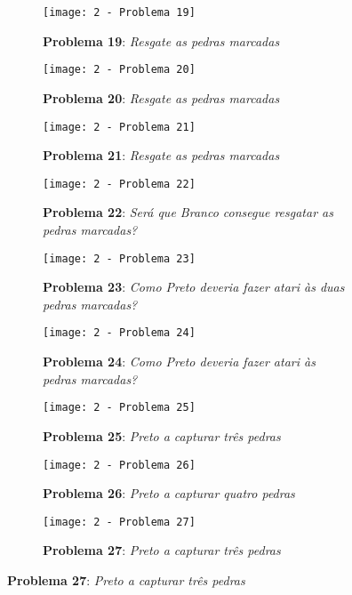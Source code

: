 \pagebreak

\begin{figure}[ht!]
    \centering
    \captionsetup{justification=raggedright,singlelinecheck=false}
    \begin{subfigure}[t]{.3\textwidth}
        \texttt{[image: 2 - Problema 19]}
        \caption*{\textbf{Problema 19}: \emph{Resgate as pedras marcadas}}
    \end{subfigure}
    \hfill
    \begin{subfigure}[t]{.3\textwidth}
        \texttt{[image: 2 - Problema 20]}
        \caption*{\textbf{Problema 20}: \emph{Resgate as pedras marcadas}}
    \end{subfigure}
    \hfill
    \begin{subfigure}[t]{.3\textwidth}
        \texttt{[image: 2 - Problema 21]}
        \caption*{\textbf{Problema 21}: \emph{Resgate as pedras marcadas}}
    \end{subfigure}
    \par\bigskip
    \begin{subfigure}[t]{.3\textwidth}
        \texttt{[image: 2 - Problema 22]}
        \caption*{\textbf{Problema 22}: \emph{Será que Branco consegue resgatar as pedras marcadas?}}
    \end{subfigure}
    \hfill
    \begin{subfigure}[t]{.3\textwidth}
        \texttt{[image: 2 - Problema 23]}
        \caption*{\textbf{Problema 23}: \emph{Como Preto deveria fazer atari às duas pedras marcadas?}}
    \end{subfigure}
    \hfill
    \begin{subfigure}[t]{.3\textwidth}
        \texttt{[image: 2 - Problema 24]}
        \caption*{\textbf{Problema 24}: \emph{Como Preto deveria fazer atari às pedras marcadas?}}
    \end{subfigure}
    \par\bigskip
    \begin{subfigure}[t]{.3\textwidth}
        \texttt{[image: 2 - Problema 25]}
        \caption*{\textbf{Problema 25}: \emph{Preto a capturar três pedras}}
    \end{subfigure}
    \hfill
    \begin{subfigure}[t]{.3\textwidth}
        \texttt{[image: 2 - Problema 26]}
        \caption*{\textbf{Problema 26}: \emph{Preto a capturar quatro pedras}}
    \end{subfigure}
    \hfill
    \begin{subfigure}[t]{.3\textwidth}
        \texttt{[image: 2 - Problema 27]}
        \caption*{\textbf{Problema 27}: \emph{Preto a capturar três pedras}}
    \end{subfigure}
\end{figure}

